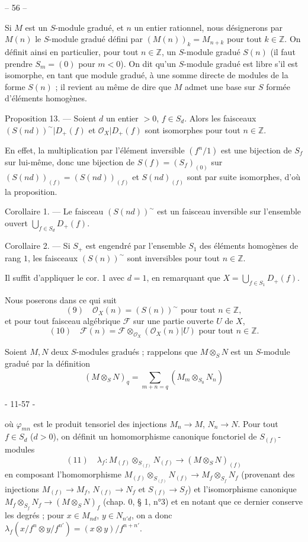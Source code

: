 -- 56 --

Si $M$ est un $S$-module gradué, et $n$ un entier rationnel, nous désignerons par $M(n)$ le $S$-module gradué défini par $(M(n))_k = M_{n+k}$ pour tout $k \in \mathbb{Z}$. On définit ainsi en particulier, pour tout $n \in \mathbb{Z}$, un $S$-module gradué $S(n)$ (il faut prendre $S_m=(0)$ pour $m < 0$). On dit qu'un $S$-module gradué est libre s'il est isomorphe, en tant que module gradué, à une somme directe de modules de la forme $S(n)$ ; il revient au même de dire que $M$ admet une base sur $S$ formée d'éléments homogènes.

Proposition 13. — Soient $d$ un entier $> 0$, $f \in S_d$. Alors les faisceaux $(S(nd))^{\sim} | D_+(f)$ et $\mathcal{O}_X | D_+(f)$ sont isomorphes pour tout $n \in \mathbb{Z}$.

En effet, la multiplication par l'élément inversible $(f^n/1)$ est une bijection de $S_f$ sur lui-même, donc une bijection de $S(f) = (S_f)_{(0)}$ sur $(S(nd))_{(f)} = (S(nd))_{(f)}$ et $S(nd)_{(f)}$ sont par suite isomorphes, d'où la proposition.

Corollaire 1. — Le faisceau $(S(nd))^{\sim}$ est un faisceau inversible sur l'ensemble ouvert $\bigcup_{f \in S_d} D_+(f)$.

Corollaire 2. — Si $S_+$ est engendré par l'ensemble $S_1$ des éléments homogènes de rang $1$, les faisceaux $(S(n))^{\sim}$ sont inversibles pour tout $n \in \mathbb{Z}$.

Il suffit d'appliquer le cor. 1 avec $d=1$, en remarquant que $X = \bigcup_{f \in S_1} D_+(f)$.

Nous poserons dans ce qui suit
$$(9) \quad \mathcal{O}_X(n) = (S(n))^{\sim} \text{ pour tout } n \in \mathbb{Z},$$
et pour tout faisceau algébrique $\mathcal{F}$ sur une partie ouverte $U$ de $X$,
$$(10) \quad \mathcal{F}(n) = \mathcal{F} \otimes_{\mathcal{O}_X} (\mathcal{O}_X(n)|U) \text{ pour tout } n \in \mathbb{Z}.$$

Soient $M, N$ deux $S$-modules gradués ; rappelons que $M \otimes_S N$ est un $S$-module gradué par la définition
$$(M \otimes_S N)_q = \sum_{m+n=q} (M_m \otimes_{S_0} N_n)$$

\newpage


- 11-57 -

où $\varphi_{mn}$ est le produit tensoriel des injections $M_n \to M$, $N_n \to N$. Pour tout $f \in S_d$ ($d>0$), on définit un homomorphisme canonique fonctoriel de $S_{(f)}$-modules
$$(11) \quad \lambda_f : M_{(f)} \otimes_{S_{(f)}} N_{(f)} \to (M \otimes_S N)_{(f)}$$
en composant l'homomorphisme $M_{(f)} \otimes_{S_{(f)}} N_{(f)} \to M_f \otimes_{S_f} N_f$ (provenant des injections $M_{(f)} \to M_f$, $N_{(f)} \to N_f$ et $S_{(f)} \to S_f$) et l'isomorphisme canonique $M_f \otimes_{S_f} N_f \to (M \otimes_S N)_f$ (chap. 0, § 1, n°3) et en notant que ce dernier conserve les degrés ; pour $x \in M_{nd}$, $y \in N_{n'd}$, on a donc $\lambda_f(x/f^n \otimes y/f^{n'}) = (x \otimes y) / f^{n+n'}$.

